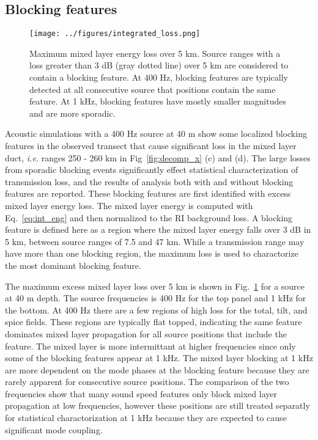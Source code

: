 \documentclass[preprint,NumberedRefs]{JASA}
\begin{document}
\subsection{Blocking features}\label{ssec:blocking}
\begin{figure}
\texttt{[image: ../figures/integrated\_loss.png]}
    \caption{Maximum mixed layer energy loss over 5 km. Source ranges with a loss greater than 3 dB (gray dotted line) over 5 km are considered to contain a blocking feature. At 400 Hz, blocking features are typically detected at all consecutive source that positions contain the same feature. At 1 kHz, blocking features have mostly smaller magnitudes and are more sporadic.}
    \label{fig:blocking}
\end{figure}

Acoustic simulations with a 400 Hz source at 40 m show some localized blocking features in the observed transect that cause significant loss in the mixed layer duct, \emph{i.e.} ranges 250 - 260 km in Fig~\ref{fig:decomp_x} (c) and (d). The large losses from sporadic blocking events significantly effect statistical characterization of transmission loss, and the results of analysis both with and without blocking features are reported. These blocking features are first identified with excess mixed layer energy loss. The mixed layer energy is computed with Eq.~\eqref{eq:int_eng} and then normalized to the RI background loss. A blocking feature is defined here as a region where the mixed layer energy falls over 3 dB in 5 km, between source ranges of 7.5 and 47 km. While a transmission range may have more than one blocking region, the maximum loss is used to charactorize the most dominant blocking feature.

The maximum excess mixed layer loss over 5 km is shown in Fig.~\ref{fig:blocking} for a source at 40 m depth. The source frequencies is 400 Hz for the top panel and 1 kHz for the bottom. At 400 Hz there are a few regions of high loss for the total, tilt, and spice fields. These regions are typically flat topped, indicating the same feature dominates mixed layer propagation for all source positions that include the feature. The mixed layer is more intermittant at higher frequencies since only some of the blocking features appear at 1 kHz. The mixed layer blocking at 1 kHz are more dependent on the mode phases at the blocking feature because they are rarely apparent for consecutive source positions. The comparison of the two frequencies show that many sound speed features only block mixed layer propagation at low frequencies, however these positions are still treated separatly for statistical charactorization at 1 kHz because they are expected to cause significant mode coupling.
\end{document}
